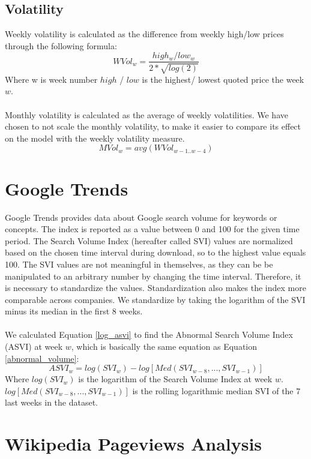 \subsection{Volatility}
Weekly volatility is calculated as the difference from weekly high/low prices through the following formula:
\begin{equation}
   \label{w_volatility} 
   WVol_{w} = \frac{high_w/low_w}{2*\sqrt{log(2)}} 
\end{equation}
Where w is week number $high$ / $low$ is the highest/ lowest quoted price the week $w$.
\\\\
Monthly volatility is calculated as the average of weekly volatilities. We have chosen to not scale the monthly volatility, to make it easier to compare its effect on the model with the weekly volatility measure.
\begin{equation}
   \label{m_volatility} 
   MVol_{w} = avg( WVol_{w-1..w-4}) 
\end{equation}
\section{Google Trends}
Google Trends provides data about Google search volume for keywords or concepts. The index is reported as a value between 0 and 100 for the given time period. The Search Volume Index (hereafter called SVI) values are normalized based on the chosen time interval during download, so to the highest value equals 100. The SVI values are not meaningful in themselves, as they can be be manipulated to an arbitrary number by changing the time interval. Therefore, it is necessary to standardize the values. Standardization also makes the index more comparable across companies. We standardize by taking the logarithm of the SVI minus its median in the first 8 weeks. 
\\\\
We calculated Equation \eqref{log_asvi} to find the Abnormal Search Volume Index (ASVI) at week $w$, which is basically the same equation as Equation \eqref{abnormal_volume}:
\begin{equation}
   \label{log_asvi} 
   ASVI_{w} = log(SVI_{w}) - log[Med(SVI_{w-8},...,SVI_{w-1})] 
\end{equation}
Where $log(SVI_{w})$ is the logarithm of the Search Volume Index at week $w$. $log[Med(SVI_{w-8},...,SVI_{w-1})]$ is the rolling logarithmic median SVI of the 7 last weeks in the dataset.

\section{Wikipedia Pageviews Analysis}

